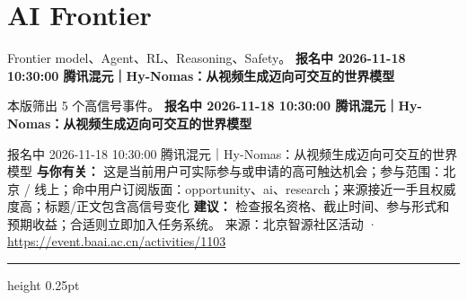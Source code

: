 \documentclass[10.5pt]{ctexart}
\begin{document}
\section*{AI Frontier}
{\color{ormuted} Frontier model、Agent、RL、Reasoning、Safety。}
\vspace{2mm}
{\LARGE\bfseries 报名中 2026-11-18 10:30:00 腾讯混元｜Hy-Nomas：从视频生成迈向可交互的世界模型}\par
\vspace{1mm}
{\color{ormuted} 本版筛出 5 个高信号事件。}
\vspace{3mm}
{\Large\bfseries 报名中 2026-11-18 10:30:00 腾讯混元｜Hy-Nomas：从视频生成迈向可交互的世界模型}\par
报名中 2026-11-18 10:30:00 腾讯混元｜Hy-Nomas：从视频生成迈向可交互的世界模型
\textbf{与你有关：} 这是当前用户可实际参与或申请的高可触达机会；参与范围：北京 / 线上；命中用户订阅版面：opportunity、ai、research；来源接近一手且权威度高；标题/正文包含高信号变化
\textbf{建议：} 检查报名资格、截止时间、参与形式和预期收益；合适则立即加入任务系统。
{\footnotesize\color{ormuted} 来源：北京智源社区活动 · \url{https://event.baai.ac.cn/activities/1103}}
\vspace{4mm}
\hrule height 0.25pt
\vspace{3mm}
\end{document}
